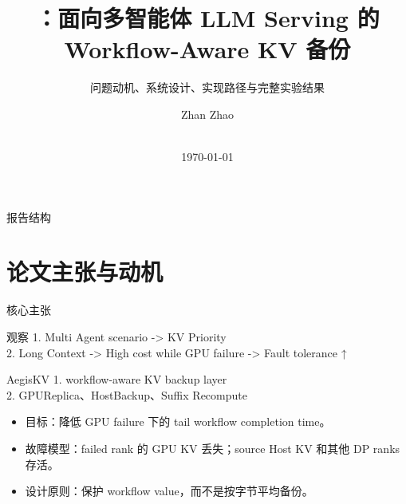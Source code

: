 \documentclass[aspectratio=43]{beamer}
\title{\AegisKV{}：面向多智能体 LLM Serving 的 Workflow-Aware KV 备份}
\subtitle{问题动机、系统设计、实现路径与完整实验结果}
\author[Zhao]{Zhan Zhao}
\institute[HKBU]{Hong Kong Baptist University}
\date[\today]{\meetingname\\\today}
\newcommand{\tightitems}{\setlength{\itemsep}{2pt}\setlength{\parskip}{0pt}}
\begin{document}
\begin{frame}[plain]
  \titlepage
\end{frame}

\begin{frame}{报告结构}
  \tableofcontents
\end{frame}

\section{论文主张与动机}

\begin{frame}{核心主张}
  \small
  \begin{block}{观察}
    1. Multi Agent scenario -> KV Priority \\
    2. Long Context -> High cost while GPU failure -> Fault tolerance ↑
  \end{block}

  \vspace{0.08cm}
  \begin{block}{AegisKV}
    1. workflow-aware KV backup layer \\
    2. GPUReplica、HostBackup、Suffix Recompute
  \end{block}

  \vspace{0.08cm}
  \begin{itemize}
    \tightitems
    \item 目标：降低 GPU failure 下的 tail workflow completion time。
    \item 故障模型：failed rank 的 GPU KV 丢失；source Host KV 和其他 DP ranks 存活。
    \item 设计原则：保护 workflow value，而不是按字节平均备份。
  \end{itemize}
\end{frame}
\end{document}
